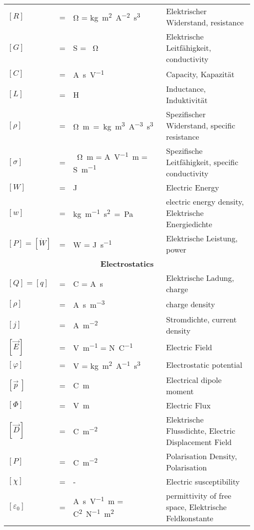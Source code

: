 {\begin{tabularx}{\linewidth}{lclX}
		$[R]$ &=& \si{\ohm} = \si{\kilogram\square\meter\per\square\ampere\second\tothe{3}} & Elektrischer Widerstand, resistance \\
		$[G]$ &=& \si{\siemens} = \si{\per\ohm} & Elektrische Leitfähigkeit, conductivity \\
		$[C]$ &=& \si{\ampere\second\per\volt} & Capacity, Kapazität \\		
		$[L]$ &=& \si{\henry} & Inductance, Induktivität \\		
		$[\rho]$ &=& \si{\ohm\meter = \kilogram \meter\cubed \per\ampere\tothe{3}\second\tothe{3}} & Spezifischer Widerstand, specific resistance \\
		$[\sigma]$ &=& \si{\per\ohm\meter} = \si{\ampere\per\volt\meter} = \si{\siemens\per\meter} & Spezifische Leitfähigkeit, specific conductivity \\
		$[W]$ &=& \si{\joule} &Electric Energy\\
		$[w]$ &=& \si{\kilogram\per\meter\square\second=\pascal} & electric energy density, Elektrische Energiedichte  \\		
		$[P] = [\dot W]$ &=& \si{\watt} = \si{\joule\per\second} & Elektrische Leistung, power \\

				
				
		\multicolumn{4}{c}{\textbf{Electrostatics}}\\
		$[Q]=[q]$ &=& \si{\coulomb} = \si{\ampere\second} & Elektrische Ladung, charge \\
		$[\rho]$ &=& \si{\ampere\second\per\meter\cubed} & charge density\\
		$[j]$ &=& \si{\ampere\per\square\meter} & Stromdichte, current density \\	
		$[\vec{E}]$ &=& \si{\volt\per\meter} = \si{\newton\per\coulomb} & Electric Field \\
		$[\varphi]$ &=& \si{\volt} = \si{\kilogram\meter\squared\per\ampere\second\cubed} & Electrostatic potential \\
		$[\vec{p}\:]$ &=& \si{\coulomb\meter} & Electrical dipole moment \\
		$[\Phi]$ &=& \si{\volt\meter} & Electric Flux\\
		$[\vec{D}]$ &=& \si{\coulomb\per\square\meter} & Elektrische Flussdichte, Electric Displacement Field\\
		$[P]$ &=& \si{\coulomb\per\square\meter} & Polarisation Density, Polarisation \\
		$[\chi]$&=& - &Electric susceptibility\\
		$[\varepsilon_0]$ &=& \si{\ampere\second\per\volt\meter} = \si{\square\coulomb\per\newton\square\meter} & permittivity of free space, Elektrische Feldkonstante \\


\end{tabularx}}
